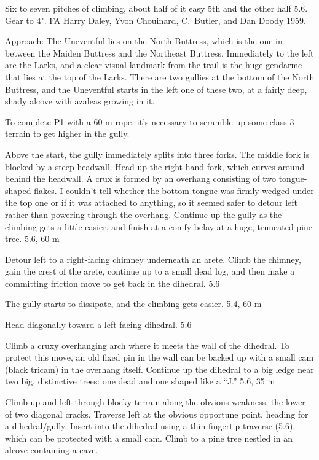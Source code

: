 \documentclass{tahquitz}
\begin{document}
Six to seven pitches of climbing, about half of it easy 5th and the
other half 5.6. Gear to 4".
FA Harry Daley, Yvon Chouinard, C.~Butler, and Dan Doody 1959.

Approach: The Uneventful lies on the North Buttress, which is the one
in between the Maiden Buttress and the Northeast Buttress. Immediately
to the left are the Larks, and a clear visual landmark from the trail
is the huge gendarme that lies at the top of the Larks. There are two
gullies at the bottom of the North Buttress, and the Uneventful starts in the
left one of these two, at a fairly deep, shady alcove with azaleas
growing in it.

To complete P1 with a 60 m rope, it's necessary to scramble up some
class 3 terrain to get higher in the gully.

 Above the start, the gully immediately splits into three
forks. The middle fork is blocked by a steep headwall.
Head up the right-hand fork, which curves around behind
the headwall. A crux is formed by an overhang consisting 
of two tongue-shaped flakes.
I couldn't tell whether the bottom tongue was firmly wedged under the top
one or if it was attached to anything, so it seemed safer to detour left
rather than powering through the overhang. Continue up the gully as the
climbing gets a little easier, and finish at a comfy belay at a huge,
truncated pine tree. 5.6, 60 m

  Detour left to a right-facing chimney underneath an arete.
Climb the chimney, gain the crest of the arete, continue up
to a small dead log, and then make a committing friction
move to get back in the dihedral. 5.6

 The gully starts to dissipate, and the climbing gets easier.
5.4, 60 m

 Head diagonally toward a left-facing dihedral. 5.6

 Climb a cruxy overhanging arch where it meets the wall of the dihedral.
To protect this move, an old fixed pin in the wall can be backed up with
a small cam (black tricam) in the overhang itself.
Continue up the dihedral to a big ledge near two big, distinctive
trees: one dead and one shaped like a ``J.'' 5.6, 35 m

 Climb up and left through blocky terrain along the obvious weakness, the
lower of two diagonal cracks. Traverse left at the obvious opportune point, heading
for a dihedral/gully. Insert into the dihedral using a thin fingertip traverse (5.6),
which can be protected with a small cam.
Climb to a pine tree nestled in an alcove containing a cave.
\end{document}
